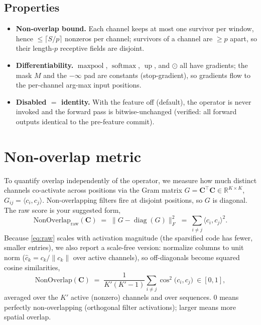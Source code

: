 \documentclass[11pt]{article}
\newcommand{\R}{\mathbb{R}}
\newcommand{\code}{\mathbf{C}}
\newcommand{\softmax}{\operatorname{softmax}}
\newcommand{\maxpool}{\operatorname{maxpool}}
\newcommand{\upnn}{\operatorname{up}}
\newcommand{\NonOv}{\mathrm{NonOverlap}}
\begin{document}
\subsection{Properties}
\begin{itemize}
\item \textbf{Non-overlap bound.} Each channel keeps at most one survivor per window, hence
$\le \lceil S/p\rceil$ nonzeros per channel; survivors of a channel are $\ge p$ apart, so
their length-$p$ receptive fields are disjoint.
\item \textbf{Differentiability.} $\maxpool$, $\softmax$, $\upnn$, and $\odot$ all have
gradients; the mask $M$ and the $-\infty$ pad are constants (stop-gradient), so gradients
flow to the per-channel arg-max input positions.
\item \textbf{Disabled $=$ identity.} With the feature off (default), the operator is never
invoked and the forward pass is bitwise-unchanged (verified: all forward outputs identical
to the pre-feature commit).
\end{itemize}

\section{Non-overlap metric}
\label{sec:metric}
To quantify overlap independently of the operator, we measure how much distinct channels
co-activate across positions via the Gram matrix $G = \code^\top\code \in \R^{K\times K}$,
$G_{ij} = \langle c_i, c_j\rangle$. Non-overlapping filters fire at disjoint positions, so
$G$ is diagonal. The raw score is your suggested form,
\begin{equation}
\label{eq:raw}
\NonOv_{\text{raw}}(\code) \;=\; \big\| G - \operatorname{diag}(G)\big\|_F^2
\;=\; \sum_{i\ne j}\langle c_i,c_j\rangle^2 .
\end{equation}
Because \eqref{eq:raw} scales with activation magnitude (the sparsified code has fewer,
smaller entries), we also report a scale-free version: normalize columns to unit norm
($\hat c_k = c_k/\|c_k\|$ over active channels), so off-diagonals become squared cosine
similarities,
\begin{equation}
\label{eq:norm}
\NonOv(\code) \;=\; \frac{1}{K'(K'-1)}\sum_{i\ne j}\cos^2\!\big(c_i,c_j\big)\ \in[0,1],
\end{equation}
averaged over the $K'$ active (nonzero) channels and over sequences. $0$ means perfectly
non-overlapping (orthogonal filter activations); larger means more spatial overlap.
\end{document}
